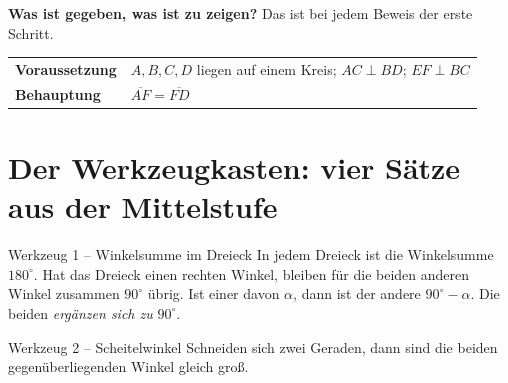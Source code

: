 \documentclass[11pt,a4paper]{article}
\newcommand{\seg}[1]{\overline{#1}}
\begin{document}
\noindent\textbf{Was ist gegeben, was ist zu zeigen?} Das ist bei jedem Beweis der erste Schritt.
\begin{center}
\begin{tabular}{@{}ll@{}}
\textbf{Voraussetzung} & $A,B,C,D$ liegen auf einem Kreis;\; $AC \perp BD$;\; $EF \perp BC$ \\
\textbf{Behauptung}    & $\seg{AF} = \seg{FD}$
\end{tabular}
\end{center}

\section{Der Werkzeugkasten: vier S\"atze aus der Mittelstufe}

\begin{werkzeug}{Werkzeug 1 -- Winkelsumme im Dreieck}
In jedem Dreieck ist die Winkelsumme $180^\circ$. Hat das Dreieck einen rechten Winkel, bleiben f\"ur
die beiden anderen Winkel zusammen $90^\circ$ \"ubrig. Ist einer davon $\alpha$, dann ist der andere
$90^\circ - \alpha$. Die beiden \emph{erg\"anzen sich zu} $90^\circ$.
\end{werkzeug}

\begin{werkzeug}{Werkzeug 2 -- Scheitelwinkel}
Schneiden sich zwei Geraden, dann sind die beiden gegen\"uberliegenden Winkel gleich gro\ss.
\begin{center}
\end{center}
\end{werkzeug}
\end{document}
